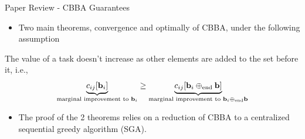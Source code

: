 \begin{frame}{Paper Review - CBBA Guarantees}
    \begin{itemize}
        \item Two main theorems, convergence and optimally of CBBA, under the following assumption
    \end{itemize}
    \begin{assum}
        The value of a task doesn't increase as other elements are added to the set before it, i.e., $$\underbrace{c_{ij}[\mathbf{b}_i]}_{\tiny \text{marginal improvement to } \mathbf{b}_i} \ge \underbrace{c_{ij}[\mathbf{b}_i \oplus_{\text{end}} \mathbf{b}]}_{\tiny \text{marginal improvement to } \mathbf{b}_i \oplus_{\text{end}} \mathbf{b}}$$
    \end{assum}
    \begin{itemize}
        \item The proof of the 2 theorems relies on a reduction of CBBA to a centralized sequential greedy algorithm (SGA).
    \end{itemize}
\end{frame}

